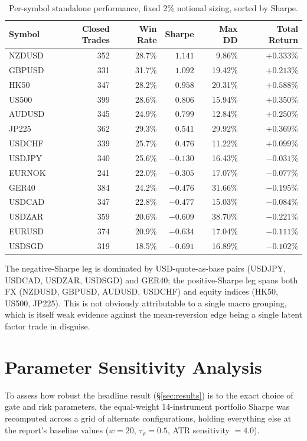 \documentclass[11pt]{article}
\newcommand{\good}[1]{\textcolor{green!45!black}{#1}}
\newcommand{\bad}[1]{\textcolor{red!55!black}{#1}}
\begin{document}
\begin{table}[H]
\centering
\caption{Per-symbol standalone performance, fixed 2\% notional sizing, sorted by Sharpe.}
\label{tab:persymbol}
\begin{tabular}{lrrrrr}
\toprule
Symbol & Closed Trades & Win Rate & Sharpe & Max DD & Total Return \\
\midrule
NZDUSD & 352 & 28.7\% & \good{$1.141$} & 9.86\% & $+0.333\%$ \\
GBPUSD & 331 & 31.7\% & \good{$1.092$} & 19.42\% & $+0.213\%$ \\
HK50   & 347 & 28.2\% & \good{$0.958$} & 20.31\% & $+0.588\%$ \\
US500  & 399 & 28.6\% & \good{$0.806$} & 15.94\% & $+0.350\%$ \\
AUDUSD & 345 & 24.9\% & \good{$0.799$} & 12.84\% & $+0.250\%$ \\
JP225  & 362 & 29.3\% & \good{$0.541$} & 29.92\% & $+0.369\%$ \\
USDCHF & 339 & 25.7\% & \good{$0.476$} & 11.22\% & $+0.099\%$ \\
USDJPY & 340 & 25.6\% & \bad{$-0.130$} & 16.43\% & $-0.031\%$ \\
EURNOK & 241 & 22.0\% & \bad{$-0.305$} & 17.07\% & $-0.077\%$ \\
GER40  & 384 & 24.2\% & \bad{$-0.476$} & 31.66\% & $-0.195\%$ \\
USDCAD & 347 & 22.8\% & \bad{$-0.477$} & 15.03\% & $-0.084\%$ \\
USDZAR & 359 & 20.6\% & \bad{$-0.609$} & 38.70\% & $-0.221\%$ \\
EURUSD & 374 & 20.9\% & \bad{$-0.634$} & 17.04\% & $-0.111\%$ \\
USDSGD & 319 & 18.5\% & \bad{$-0.691$} & 16.89\% & $-0.102\%$ \\
\bottomrule
\end{tabular}
\end{table}

The negative-Sharpe leg is dominated by USD-quote-as-base pairs (USDJPY, USDCAD, USDZAR, USDSGD) and
GER40; the positive-Sharpe leg spans both FX (NZDUSD, GBPUSD, AUDUSD, USDCHF) and equity indices
(HK50, US500, JP225). This is not obviously attributable to a single macro grouping, which is itself
weak evidence against the mean-reversion edge being a single latent factor trade in disguise.

\section{Parameter Sensitivity Analysis}
\label{sec:sensitivity}
To assess how robust the headline result (\S\ref{sec:results}) is to the exact choice of gate and
risk parameters, the equal-weight 14-instrument portfolio Sharpe was recomputed across a grid of
alternate configurations, holding everything else at the report's baseline values
($w=20$, $\tau_\rho=0.5$, ATR sensitivity $=4.0$).
\end{document}
